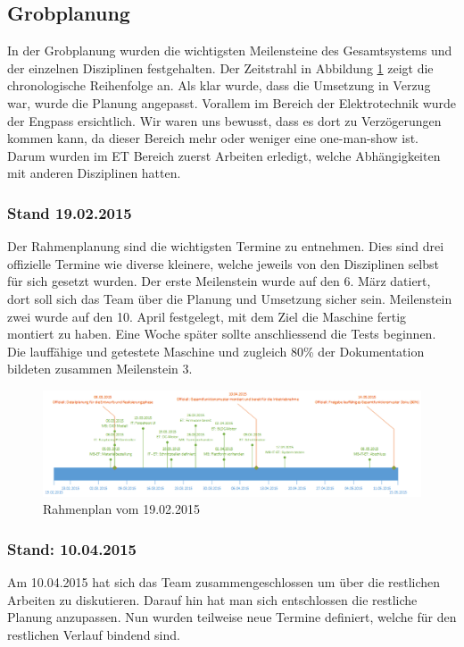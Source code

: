 \subsection{Grobplanung}
In der Grobplanung wurden die wichtigsten Meilensteine des Gesamtsystems und der einzelnen Disziplinen festgehalten.
Der Zeitstrahl in Abbildung \ref{fig:rahmenplanung} zeigt die chronologische Reihenfolge an. Als klar wurde, dass die Umsetzung in Verzug war, wurde die Planung angepasst. Vorallem im Bereich der Elektrotechnik wurde der Engpass ersichtlich. Wir waren uns bewusst, dass es dort zu Verzögerungen kommen kann, da dieser Bereich mehr oder weniger eine one-man-show ist. Darum wurden im ET Bereich zuerst Arbeiten erledigt, welche Abhängigkeiten mit anderen Disziplinen hatten.

\subsubsection{Stand 19.02.2015}
Der Rahmenplanung sind die wichtigsten Termine zu entnehmen. Dies sind drei offizielle Termine wie diverse kleinere, welche jeweils von den Disziplinen selbst für sich gesetzt wurden. Der erste Meilenstein wurde auf den 6. März datiert, dort soll sich das Team über die Planung und Umsetzung sicher sein.
Meilenstein zwei wurde auf den 10. April festgelegt, mit dem Ziel die Maschine fertig montiert zu haben. Eine Woche später sollte anschliessend die Tests beginnen. Die lauffähige und getestete Maschine und zugleich 80\% der Dokumentation bildeten zusammen Meilenstein 3.

\begin{figure}[h!]
	\centering
	\includegraphics[width=1\linewidth]{../../fig/rahmenplanung}
	\caption{Rahmenplan vom 19.02.2015}
	\label{fig:rahmenplanung}
\end{figure}

\newpage
\subsubsection{Stand: 10.04.2015}
Am 10.04.2015 hat sich das Team zusammengeschlossen um über die restlichen Arbeiten zu diskutieren. Darauf hin hat man sich entschlossen die restliche Planung anzupassen. Nun wurden teilweise neue Termine definiert, welche für den restlichen Verlauf bindend sind.

